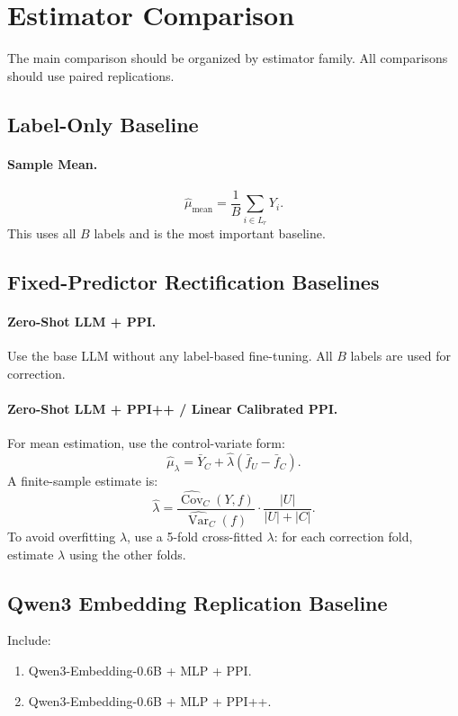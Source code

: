 \documentclass[11pt]{article}
\begin{document}
\section{Estimator Comparison}

The main comparison should be organized by estimator family. All comparisons should use paired replications.

\subsection{Label-Only Baseline}

\paragraph{Sample Mean.}
\[
\hat\mu_{\mathrm{mean}}=\frac{1}{B}\sum_{i\in L_r}Y_i.
\]
This uses all $B$ labels and is the most important baseline.

\subsection{Fixed-Predictor Rectification Baselines}

\paragraph{Zero-Shot LLM + PPI.}
Use the base LLM without any label-based fine-tuning. All $B$ labels are used for correction.

\paragraph{Zero-Shot LLM + PPI++ / Linear Calibrated PPI.}
For mean estimation, use the control-variate form:
\[
\hat\mu_{\lambda}
=
\bar Y_C+\hat\lambda(\bar f_U-\bar f_C).
\]
A finite-sample estimate is:
\[
\hat\lambda
=
\frac{\widehat{\operatorname{Cov}}_C(Y,f)}{\widehat{\operatorname{Var}}_C(f)}
\cdot
\frac{|U|}{|U|+|C|}.
\]
To avoid overfitting $\lambda$, use a 5-fold cross-fitted $\lambda$: for each correction fold, estimate $\lambda$ using the other folds.

\subsection{Qwen3 Embedding Replication Baseline}

Include:

\begin{enumerate}
    \item Qwen3-Embedding-0.6B + MLP + PPI.
    \item Qwen3-Embedding-0.6B + MLP + PPI++.
\end{enumerate}
\end{document}
